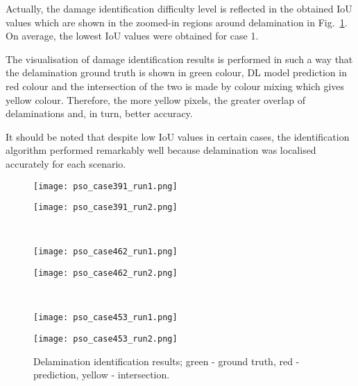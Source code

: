 \documentclass[pdflatex,sn-mathphys-num]{sn-jnl}%
\begin{document}
	Actually, the damage identification difficulty level is reflected in the 
	obtained IoU values which are shown in the zoomed-in regions around 
	delamination in Fig.~\ref{fig:pso_identification}.
	On average, the lowest IoU values were obtained for case 1.
	
	The visualisation of damage identification results is performed in such a 
	way that the delamination ground truth is shown in green colour, DL model 
	prediction in red colour and the intersection of the two is made by colour 
	mixing which gives yellow colour.
	Therefore, the more yellow pixels, the greater overlap of delaminations 
	and, in turn, better accuracy.
	
	It should be noted that despite low IoU values in certain cases, the 
	identification algorithm performed remarkably well because delamination was 
	localised accurately for each scenario.
	
\begin{figure}
	\centering
	\begin{minipage}[b]{0.44\textwidth}
		\centering
		\texttt{[image: pso\_case391\_run1.png]}
		\caption*{Case 1, run 1}
		\label{fig:pso_case391_run1}
	\end{minipage}
	\hfill
	\begin{minipage}[b]{0.44\textwidth}
		\centering
		\texttt{[image: pso\_case391\_run2.png]}
		\caption*{Case 1, run 2}
		\label{fig:pso_case391_run2}
	\end{minipage}
	\\
	\begin{minipage}[b]{0.44\textwidth}
		\centering
		\texttt{[image: pso\_case462\_run1.png]}
		\caption*{Case 2, run 1}
		\label{fig:pso_case462_run1}
	\end{minipage}
	\hfill
	\begin{minipage}[b]{0.44\textwidth}
		\centering
		\texttt{[image: pso\_case462\_run2.png]}
		\caption*{Case 2, run 2}
		\label{fig:pso_case462_run2}
	\end{minipage}
	\\
	\begin{minipage}[b]{0.44\textwidth}
		\centering
		\texttt{[image: pso\_case453\_run1.png]}
		\caption*{Case 3, run 1}
		\label{fig:pso_case453_run1}
	\end{minipage}
	\hfill
	\begin{minipage}[b]{0.44\textwidth}
		\centering
		\texttt{[image: pso\_case453\_run2.png]}
		\caption*{Case 3, run 2}
		\label{fig:pso_case453_run2}
	\end{minipage}
	\caption{Delamination identification results; green - ground truth, red 
	- prediction, yellow - intersection.}
	\label{fig:pso_identification}
	\end{figure}
	
\end{document}
